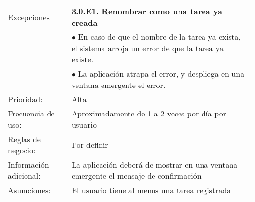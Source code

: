 \begin{longtable}[c]{p{3cm}p{5cm}p{4cm}p{2cm}}
  \hline
  Excepciones & \multicolumn{3}{p{11cm}}{\textbf{3.0.E1. Renombrar como una tarea ya creada}}\\
	      & \multicolumn{3}{p{11cm}}{$\bullet$ En caso de que el nombre de la tarea ya exista, el sistema arroja un error de que la tarea ya existe.}\\
	      & \multicolumn{3}{p{11cm}}{$\bullet$ La aplicaci\'on atrapa el error, y despliega en una ventana emergente el error.}\\
  \hline
  Prioridad: & \multicolumn{3}{p{11cm}}{Alta}\\
  \hline
  Frecuencia de uso: & \multicolumn{3}{p{11cm}}{Aproximadamente de 1 a 2 veces por d\'ia por usuario}\\
  \hline
  Reglas de negocio: & \multicolumn{3}{p{11cm}}{Por definir}\\
  \hline
  Informaci\'on adicional: & \multicolumn{3}{p{11cm}}{La aplicaci\'on deber\'a de mostrar en una ventana emergente el mensaje de confirmaci\'on}\\
  \hline
  Asumciones: & \multicolumn{3}{p{11cm}}{El usuario tiene al menos una tarea registrada}\\
  \hline
\end{longtable}
